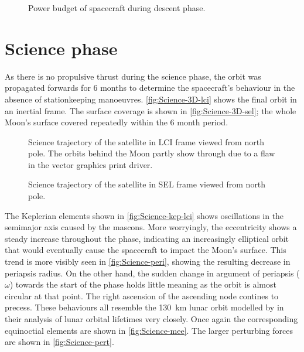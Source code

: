 \begin{figure}
\centering
\def\svgwidth{\figurewidth}

\caption{Power budget of spacecraft during descent phase.} \label{fig:Descent-power}
\end{figure}


\clearpage


\section{Science phase} \label{sec:Science}

As there is no propulsive thrust during the science phase, the orbit was propagated forwards for 6 months to determine the spacecraft's behaviour in the absence of stationkeeping manoeuvres. \autoref{fig:Science-3D-lci} shows the final orbit in an inertial frame. The surface coverage is shown in \autoref{fig:Science-3D-sel}; the whole Moon's surface covered repeatedly within the 6 month period. 

\begin{figure}[h]
\centering
\def\svgwidth{\figurewidth}

\caption{Science trajectory of the satellite in LCI frame viewed from north pole. The orbits behind the Moon partly show through due to a flaw in the vector graphics print driver.} \label{fig:Science-3D-lci}
\end{figure}

\begin{figure}
\centering
\def\svgwidth{\figurewidth}

\caption{Science trajectory of the satellite in SEL frame viewed from north pole.} \label{fig:Science-3D-sel}
\end{figure}

The Keplerian elements shown in \autoref{fig:Science-kep-lci} shows oscillations in the semimajor axis caused by the mascons. More worryingly, the eccentricity shows a steady increase throughout the phase, indicating an increasingly elliptical orbit that would eventually cause the spacecraft to impact the Moon's surface. This trend is more visibly seen in \autoref{fig:Science-peri}, showing the resulting decrease in periapsis radius. On the other hand, the sudden change in argument of periapsis ($\omega$) towards the start of the phase holds little meaning as the orbit is almost circular at that point. The right ascension of the ascending node contines to precess. These behaviours all resemble the 130~km lunar orbit modelled by \textcite{Gupta2011} in their analysis of lunar orbital lifetimes very closely. Once again the corresponding equinoctial elements are shown in \autoref{fig:Science-mee}. The larger perturbing forces are shown in \autoref{fig:Science-pert}.

